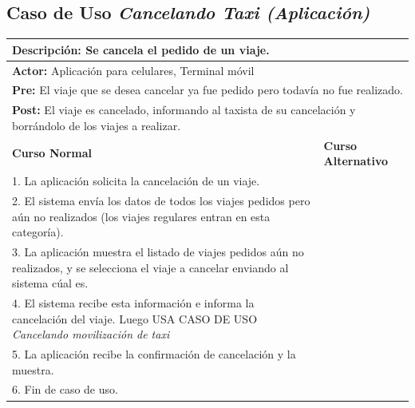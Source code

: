 \documentclass[a4paper]{article}
\begin{document}
\subsection{Caso de Uso \textit{Cancelando Taxi (Aplicaci\'on)}}
\begin{center}
\begin{tabular}{|p{10cm} | p{6cm}|}
\hline
\multicolumn{2}{|p{16cm}|}{\textbf{Descripci\'on:} Se cancela el pedido de un viaje.} \\
\hline
\multicolumn{2}{|l|}{\textbf{Actor:} Aplicaci\'on para celulares, Terminal m\'ovil} \\ %
\hline
\multicolumn{2}{|p{15cm}|}{\textbf{Pre:} El viaje que se desea cancelar ya fue pedido pero todav\'ia no fue realizado. } \\
\hline
\multicolumn{2}{|p{15cm}|}{\textbf{Post:} El viaje es cancelado, informando al taxista de su cancelaci\'on y borr\'andolo de los viajes a realizar.}\\
\hline
\textbf{Curso Normal}  & \textbf{Curso Alternativo} \\ \hline
1. La aplicaci\'on solicita la cancelaci\'on de un viaje. & \\ \hline
2. El sistema env\'ia los datos de todos los viajes pedidos pero a\'un no realizados (los viajes regulares entran en esta categor\'ia). & \\ \hline
3. La aplicaci\'on muestra el listado de viajes pedidos a\'un no realizados, y se selecciona el viaje a cancelar enviando al sistema c\'ual es. & \\ \hline
4. El sistema recibe esta informaci\'on e informa la cancelaci\'on del viaje. Luego USA CASO DE USO \textit{Cancelando movilizaci\'on de taxi} & \\ \hline %
5. La aplicaci\'on recibe la confirmaci\'on de cancelaci\'on y la muestra. & \\ \hline
6. Fin de caso de uso. & \\ \hline
\end{tabular}
\end{center}
\end{document}
